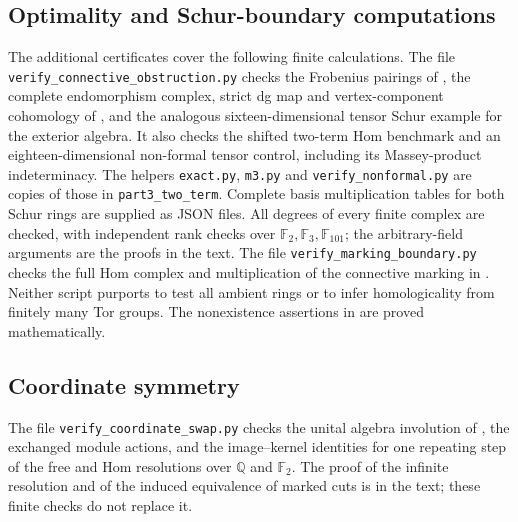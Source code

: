 \subsection*{Optimality and Schur-boundary computations}
The additional certificates cover the following finite calculations.  The file \texttt{verify\_connective\_obstruction.py} checks the Frobenius pairings of , the complete endomorphism complex, strict dg map and vertex-component cohomology of , and the analogous sixteen-dimensional tensor Schur example for the exterior algebra.  It also checks the shifted two-term Hom benchmark and an eighteen-dimensional non-formal tensor control, including its Massey-product indeterminacy.  The helpers \texttt{exact.py}, \texttt{m3.py} and \texttt{verify\_nonformal.py} are copies of those in \texttt{part3\_two\_term}.  Complete basis multiplication tables for both Schur rings are supplied as JSON files.  All degrees of every finite complex are checked, with independent rank checks over \(\mathbb F_2,\mathbb F_3,\mathbb F_{101}\); the arbitrary-field arguments are the proofs in the text.  The file \texttt{verify\_marking\_boundary.py} checks the full Hom complex and multiplication of the connective marking in .  Neither script purports to test all ambient rings or to infer homologicality from finitely many Tor groups.  The nonexistence assertions in  are proved mathematically.

\subsection*{Coordinate symmetry}
The file \texttt{verify\_coordinate\_swap.py} checks the unital algebra involution of , the exchanged module actions, and the image--kernel identities for one repeating step of the free and Hom resolutions over \(\mathbb Q\) and \(\mathbb F_2\). The proof of the infinite resolution and of the induced equivalence of marked cuts is in the text; these finite checks do not replace it.
